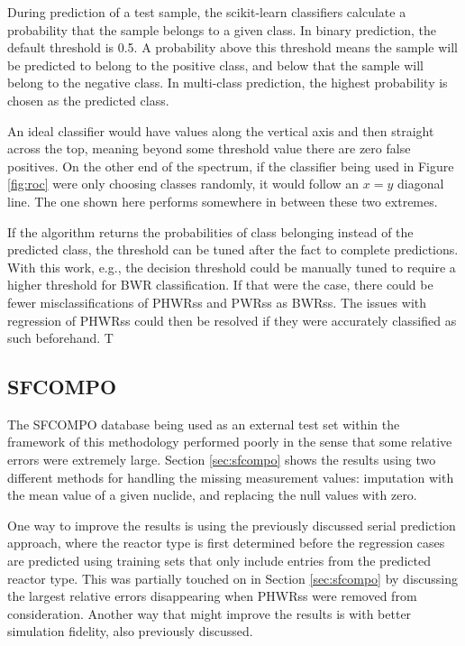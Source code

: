 During prediction of a test sample, the scikit-learn classifiers calculate a
probability that the sample belongs to a given class. In binary prediction, the
default threshold is 0.5. A probability above this threshold means the sample
will be predicted to belong to the positive class, and below that the sample
will belong to the negative class.  In multi-class prediction, the highest
probability is chosen as the predicted class.

An ideal classifier would have values along the vertical axis and then straight
across the top, meaning beyond some threshold value there are zero false
positives. On the other end of the spectrum, if the classifier being used in
Figure \ref{fig:roc} were only choosing classes randomly, it would follow an
$x=y$ diagonal line. The one shown here performs somewhere in between these two
extremes. 

If the algorithm returns the probabilities of class belonging instead of the
predicted class, the threshold can be tuned after the fact to complete
predictions.  With this work, e.g., the decision threshold  could be manually
tuned to require a higher threshold for \gls{BWR} classification. If that were
the case, there could be fewer misclassifications of \glspl{PHWR}s and
\glspl{PWR}s as \glspl{BWR}s. The issues with regression of \glspl{PHWR}s could
then be resolved if they were accurately classified as such beforehand. T

\subsection{SFCOMPO}

The \gls{SFCOMPO} database being used as an external test set within the
framework of this methodology performed poorly in the sense that some relative
errors were extremely large.  Section \ref{sec:sfcompo} shows the results using
two different methods for handling the missing measurement values: imputation
with the mean value of a given nuclide, and replacing the null values with
zero. 

One way to improve the results is using the previously discussed serial
prediction approach, where the reactor type is first determined before the
regression cases are predicted using training sets that only include entries
from the predicted reactor type.  This was partially touched on in Section
\ref{sec:sfcompo} by discussing the largest relative errors disappearing when
\glspl{PHWR}s were removed from consideration.  Another way that might improve
the results is with better simulation fidelity, also previously discussed. 

